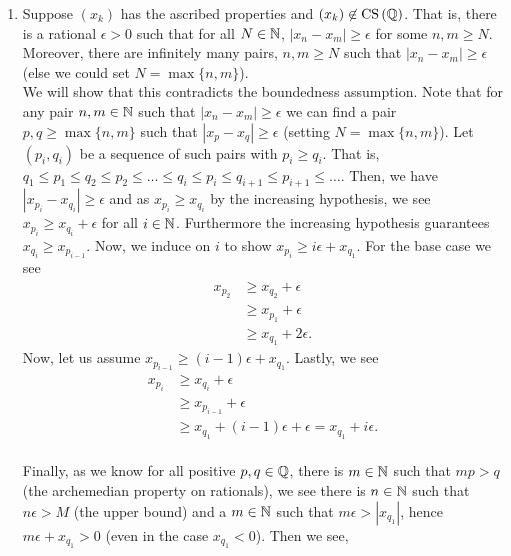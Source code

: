 \documentclass[a4paper]{article}
\begin{document}
\begin{solution}
	\begin{enumerate}
		\item Suppose \(\left( x_{k} \right) \) has the ascribed properties and \(\left( x_{k} \right) \not\in \operatorname{CS}\left( \mathbb{Q} \right) \). That is, there is a rational \(\epsilon > 0\) such that for all \(N \in \mathbb{N}\), \(\left| x_{n} - x_{m} \right| \ge \epsilon \) for some \(n, m \ge N\). Moreover, there are infinitely many pairs, \(n, m \ge N\) such that \(\left| x_{n} - x_{m} \right| \ge \epsilon\) (else we could set \(N = \max \{n, m\} \)).
			\\ We will show that this contradicts the boundedness assumption. Note that for any pair \(n, m \in \mathbb{N}\) such that \(\left| x_{n} - x_{m} \right| \ge \epsilon\) we can find a pair \(p, q \ge \max \{n, m\} \) such that \(\left| x_{p} - x_{q} \right| \ge \epsilon \) (setting \(N = \max \{n, m\} \)). Let \(\left( p_{i}, q_{i} \right) \) be a sequence of such pairs with \(p_{i} \ge q_{i}\). That is, \(q_1 \le p_1 \le q_2 \le p_2 \le \ldots \le q_{i} \le p_{i} \le q_{i+1} \le p_{i+1}\le \ldots\). Then, we have \(\left| x_{p_{i}} - x_{q_{i}} \right| \ge \epsilon \) and as \(x_{p_{i}}\ge x_{q_{i}}\) by the increasing hypothesis, we see \(x_{p_{i}} \ge x_{q_{i}} + \epsilon\) for all \(i \in \mathbb{N}\). Furthermore the increasing hypothesis guarantees \(x_{q_{i}} \ge x_{p_{i-1}}\). Now, we induce on \(i\) to show \(x_{p_{i}} \ge  i \epsilon + x_{q_1} \). For the base case we see
			\begin{align*}
				x_{p_2} &\ge x_{q_2} + \epsilon\\
					&\ge x_{p_1} + \epsilon\\
					&\ge x_{q_1} + 2\epsilon
			.\end{align*}
			Now, let us assume \(x_{p_{i-1}} \ge \left( i-1 \right) \epsilon + x_{q_{1}}\). Lastly, we see
			\begin{align*}
				x_{p_{i}} &\ge x_{q_{i}} + \epsilon\\
					  &\ge x_{p_{i-1}} + \epsilon \\
					  &\ge x_{q_1} + \left( i-1 \right) \epsilon  + \epsilon = x_{q_1} + i\epsilon
			.\end{align*}
\\
Finally, as we know for all positive \(p,q \in \mathbb{Q}\), there is \(m \in \mathbb{N}\) such that \(mp > q\) (the archemedian property on rationals), we see there is \(n \in \mathbb{N}\) such that \(n \epsilon > M\) (the upper bound) and a \(m \in \mathbb{N}\) such that \(m\epsilon > \left| x_{q_1} \right| \), hence \(m\epsilon + x_{q_1} > 0\) (even in the case \(x_{q_1} < 0\)). Then we see,

\end{enumerate}
\end{solution}
\end{document}
